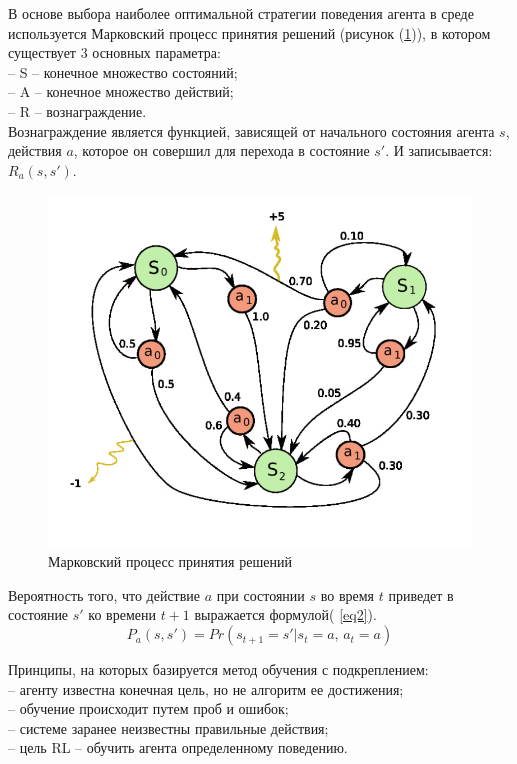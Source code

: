\documentclass[12 pt, a4paper]{article}
\theoremstyle{definition}
\theoremstyle{plain}
\theoremstyle{remark}
\begin{document}
В основе выбора наиболее оптимальной стратегии поведения агента в среде используется Марковский процесс принятия решений (рисунок (\ref{ris:2})), в котором существует 3 основных параметра:\\
-- S -- конечное множество состояний;\\
-- A -- конечное множество действий;\\
-- R -- вознаграждение.\\
Вознаграждение является функцией, зависящей от начального состояния агента $s$, действия $a$, которое он совершил для перехода в состояние $s'$. И записывается: $R_a (s, s')$.

\begin{figure}[h]
		\begin{center}
                      \includegraphics[scale=0.5]{"./мппр.jpg"}
	           \caption{Марковский процесс принятия решений}\label{ris:2}
		\end{center}
\end{figure}
Вероятность того, что действие $a$ при состоянии $s$ во время $t$ приведет в состояние $s'$ ко времени $t+1$ выражается формулой( \ref{eq2}).
\begin{equation}\label{eq2}
P_a(s, s') = Pr(s_{t+1} = s' | s_t = a, \, a_t = a)
\end{equation}

Принципы, на которых базируется метод обучения с подкреплением:\\
-- агенту известна конечная цель, но не алгоритм ее достижения;\\
-- обучение происходит путем проб и ошибок;\\
-- системе заранее неизвестны правильные действия;\\
-- цель RL -- обучить агента определенному поведению.\\
\end{document}
